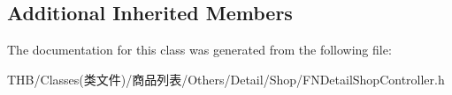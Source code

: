 \subsection*{Additional Inherited Members}


The documentation for this class was generated from the following file\+:\begin{DoxyCompactItemize}
\item 
T\+H\+B/\+Classes(类文件)/商品列表/\+Others/\+Detail/\+Shop/F\+N\+Detail\+Shop\+Controller.\+h\end{DoxyCompactItemize}
